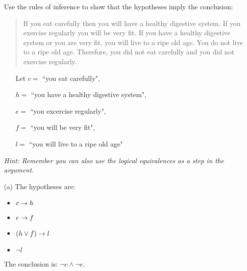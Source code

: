 \begin{questions}
 Use the rules of inference to show that the hypotheses imply the conclusion:

\begin{quote}
If you eat carefully then you will have a healthy digestive system. If you exercise regularly you will be very fit. If you have a healthy digestive system or you are very fit, you will live to a ripe old age. You do not live to a ripe old age. Therefore, you did not eat carefully and you did not exercise regularly.
\end{quote}

\begin{itemize}[itemsep=0pt,parsep=0pt,topsep=0pt,partopsep=0pt,leftmargin=0.8in]
    \item[Let $c = $] ``you eat carefully",
    \item[$h = $] ``you have a healthy digestive system",
    \item[$e = $] ``you excercise regularly",
    \item[$f = $] ``you will be very fit", 
    \item[$l = $] ``you will live to a ripe old age"
\end{itemize}


\textit{Hint: Remember you can also use the logical equivalences as a step in the argument.}
    \ifprintanswers
        \vspace{-2pt}
    \fi
\begin{solution}
  (a) The hypotheses are: 
  	\begin{itemize}[itemsep=0pt,parsep=0pt,topsep=0pt,partopsep=0pt]
  		\item $c \rightarrow h$ 
  		\item $e \rightarrow f$ 
  		\item $(h \vee f) \rightarrow l$ 
  		\item $\neg l$ 
  	\end{itemize}
  The conclusion is: $\neg c \wedge \neg e$.


\end{solution}
\end{questions}
